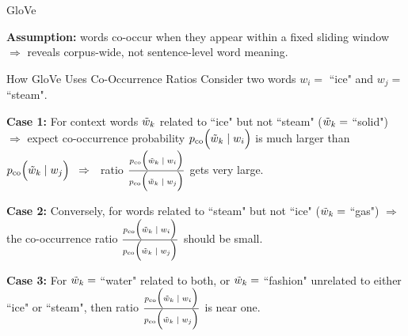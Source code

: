 \begin{frame}{GloVe}

\begin{itemizeSpaced}{0pt}
    \item \textbf{Assumption: } words co-occur when they appear within a fixed sliding window $\Rightarrow$ reveals corpus-wide, not sentence-level word meaning.
\end{itemizeSpaced}

\begin{exampleBlock}{How GloVe Uses Co-Occurrence Ratios \footnotemark}
Consider two words $w_i =$ ``ice" and $w_j = $ ``steam". 

\begin{itemizeSpaced}{0pt}
    \item \textbf{Case 1:} For context words $\Tilde{w}_k$ related to ``ice" but not ``steam" ($\Tilde{w}_k = $ ``solid") $\Rightarrow$ expect co-occurrence probability $p_{\text{co}} \Big( \Tilde{w}_k \; | \; w_i \Big)$ is much larger than $p_{\text{co}} \Big( \Tilde{w}_k \; | \; w_j \Big)  \;\; \Rightarrow \;\; $ ratio $\frac {p_{\text{co}} \Big( \Tilde{w}_k \; | \; w_i \Big)} {p_{\text{co}} \Big( \Tilde{w}_k \; | \; w_j \Big)}$ gets very large.

    \item \textbf{Case 2: } Conversely, for words related to ``steam" but not ``ice" ($\Tilde{w}_k = $ ``gas") $\Rightarrow$ the co-occurrence ratio $\frac {p_{\text{co}} \Big( \Tilde{w}_k \; | \; w_i \Big)} {p_{\text{co}} \Big( \Tilde{w}_k \; | \; w_j \Big)}$ should be small. 

    \item \textbf{Case 3:} For $\Tilde{w}_k = $ ``water" related to both, or $\Tilde{w}_k = $ ``fashion" unrelated to either ``ice" or ``steam", then ratio $\frac {p_{\text{co}} \Big( \Tilde{w}_k \; | \; w_i \Big)} {p_{\text{co}} \Big( \Tilde{w}_k \; | \; w_j \Big)}$ is near one. 
\end{itemizeSpaced}
\end{exampleBlock}




\end{frame}



